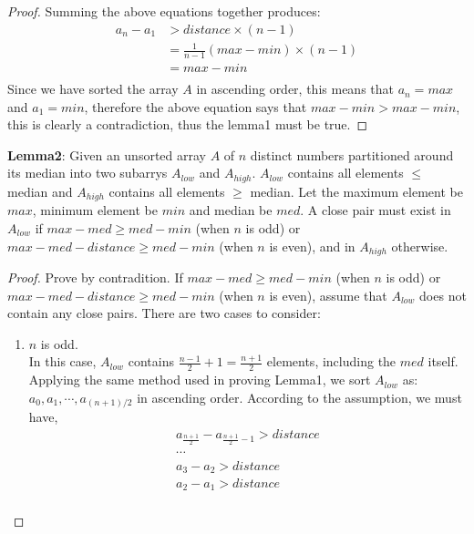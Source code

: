 \documentclass[11pt]{article}
\begin{document}
\begin{enumerate}
\begin{proof}
    Summing the above equations together produces:
    \begin{equation}
      \begin{split}
        a_n - a_1 &> distance \times (n-1)\\
        & = \frac{1}{n-1} (max - min) \times (n-1)\\
        & = max - min\\
      \end{split}
    \end{equation}
    Since we have sorted the array $A$ in ascending order, this means
    that $a_n = max$ and $a_1 = min$, therefore the above equation says that
    $max - min > max - min$, this is clearly a contradiction, thus the lemma1
    must be true.
  \end{proof}

  \textbf{Lemma2}: Given an unsorted array $A$ of $n$ distinct
  numbers partitioned around its median into two subarrys $A_{low}$ and
  $A_{high}$. $A_{low}$ contains all elements $\leq$ median and
  $A_{high}$ contains all elements $\geq$ median. 
  Let the maximum element be $max$, minimum element be $min$ and median
  be $med$. A close pair must exist in $A_{low}$ if $max-med \geq
  med-min$ (when $n$ is odd) or $max-med-distance \geq med-min$ (when $n$ is
  even), and in $A_{high}$ otherwise. 

  \begin{proof}
    Prove by contradition.
    If $max-med \geq med-min$ (when $n$ is odd) or $max-med-distance \geq
    med-min$ (when $n$ is even), assume that $A_{low}$ does not contain
    any close pairs. There are two cases to consider:
    \begin{enumerate}
    \item $n$ is odd.\\
      In this case, $A_{low}$ contains $\frac{n-1}{2}+1=\frac{n+1}{2}$ elements,
      including the $med$ itself. Applying the same method used in
      proving Lemma1, we sort $A_{low}$ as: $a_0,
      a_1, \cdots, a_{(n+1)/2}$ in ascending order. According to the
      assumption, we must have,
      \begin{equation}
        \begin{split}
          a_{\frac{n+1}{2}} - a_{\frac{n+1}{2}-1} > distance\\
          \cdots\\
          a_3 - a_2 > distance\\
          a_2 - a_1 > distance\\
        \end{split}
      \end{equation}


\end{enumerate}
\end{proof}
\end{enumerate}
\end{document}
